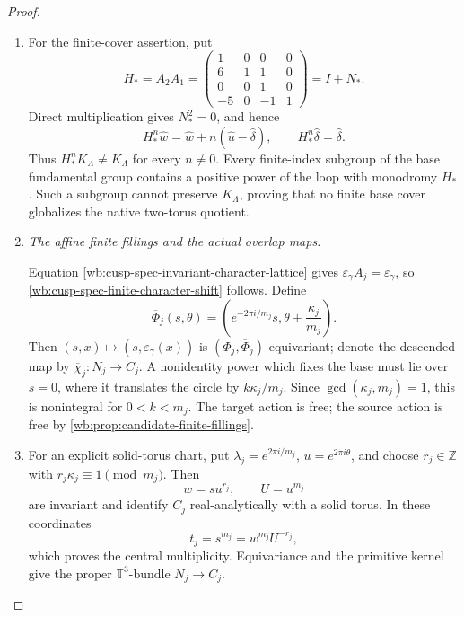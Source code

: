 \begin{proof}
\begin{enumerate}[label=\arabic*.,leftmargin=*]
\item For the finite-cover assertion, put
\begin{equation}
 H_*=A_2A_1
 =\begin{pmatrix}
 1&0&0&0\\
 6&1&1&0\\
 0&0&1&0\\
 -5&0&-1&1
 \end{pmatrix}=I+N_*.
 \label{wb:cusp-spec-no-finite-cover-matrix}
\end{equation}
Direct multiplication gives \(N_*^2=0\), and hence
\begin{equation}
 H_*^n\widehat w
 =\widehat w+n(\widehat u-\widehat\delta),\qquad
 H_*^n\widehat\delta=\widehat\delta.
 \label{wb:cusp-spec-no-finite-cover-orbit}
\end{equation}
Thus \(H_*^nK_\Lambda\ne K_\Lambda\) for every \(n\ne0\).
Every finite-index subgroup of the base fundamental group contains a
positive power of the loop with monodromy \(H_*\).  Such a subgroup cannot
preserve \(K_\Lambda\), proving that no finite base cover globalizes the
native two-torus quotient.

\item \medskip\noindent\emph{The affine finite fillings and the actual overlap
maps.}\par
Equation \cref{wb:cusp-spec-invariant-character-lattice} gives
\(\varepsilon_\gamma A_j=\varepsilon_\gamma\), so
\cref{wb:cusp-spec-finite-character-shift} follows.  Define
\[
 \overline\Phi_j(s,\theta)
 =\left(e^{-2\pi i/m_j}s,\theta+\frac{\kappa_j}{m_j}\right).
\]
Then \((s,x)\mapsto(s,\varepsilon_\gamma(x))\) is
\((\Phi_j,\overline\Phi_j)\)-equivariant; denote the descended map by
\(\overline\chi_j:N_j\to C_j\).  A nonidentity power which fixes
the base must lie over \(s=0\), where it translates the circle by
\(k\kappa_j/m_j\).  Since \(\gcd(\kappa_j,m_j)=1\), this is nonintegral
for \(0<k<m_j\).  The target action is free; the source action is free by
\cref{wb:prop:candidate-finite-fillings}.

\item For an explicit solid-torus chart, put
\(\lambda_j=e^{2\pi i/m_j}\), \(u=e^{2\pi i\theta}\), and choose
\(r_j\in\mathbb Z\) with \(r_j\kappa_j\equiv1\pmod {m_j}\).  Then
\[
 w=su^{r_j},\qquad U=u^{m_j}
\]
are invariant and identify \(C_j\) real-analytically with a solid torus.
In these coordinates
\[
 t_j=s^{m_j}=w^{m_j}U^{-r_j},
\]
which proves the central multiplicity.  Equivariance and the primitive
kernel give the proper \(\mathbb T^3\)-bundle \(N_j\to C_j\).


\end{enumerate}
\end{proof}

